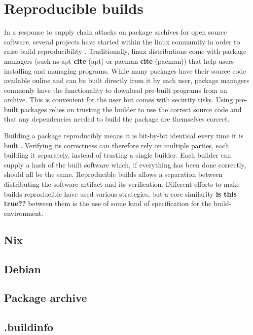 \documentclass[english, biblatex, digitaloutput]{kththesis}
\begin{document}
\section{Reproducible builds}

In a response to supply chain attacks on package archives for open source software, several projects have started within the linux community in order to raise build reproducibility \cite{reproducible_builds_project}. Traditionally, linux distributions come with package managers (such as apt \textbf{cite} (apt) or pacman \textbf{cite} (pacman)) that help users installing and managing programs. While many packages have their source code available online and can be built directly from it by each user, package managers commonly have the functionality to download pre-built programs from an archive. This is convenient for the user but comes with security risks. Using pre-built packages relies on trusting the builder to use the correct source code and that any dependencies needed to build the package are themselves correct.

Building a package reproducibly means it is bit-by-bit identical every time it is built \cite{lamb_reproducible_2021}. Verifying its correctness can therefore rely on multiple parties, each building it separately, instead of trusting a single builder. Each builder can supply a hash of the built software which, if everything has been done correctly, should all be the same. Reproducible builds allows a separation between distributing the software artifact and its verification. Different efforts to make builds reproducible have used various strategies, but a core similarity \textbf{is this true??} between them is the use of some kind of specification for the build-environment.

\subsection{Nix}

\subsection{Debian}

\subsection{Package archive}

\subsection{.buildinfo}
\end{document}

